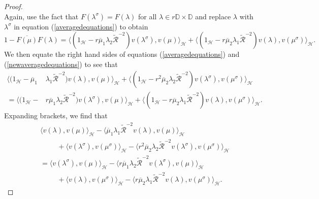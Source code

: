 \documentclass[10pt,a4paper]{amsart}
\begin{document}
\begin{proof}
\begin{equation}
\end{equation}
Again, use the fact that $F(\lambda^{\sigma})=F(\lambda)$ for all $\lambda\in r \mathbb{D}\times\mathbb{D}$ and replace $\lambda$ with $\lambda^{\sigma}$ in equation (\ref{averagedequations}) to obtain
\begin{equation}\label{newaveragedequations}
1-\overline{F(\mu)}F(\lambda) = \Big\langle(1_{\mathcal{H}}-r\overline{\mu}_{1}\lambda_{2}\widetilde{\mathcal{R}}^{-2})v(\lambda^{\sigma}),v(\mu)\Big\rangle_{\mathcal{H}}+\Big\langle(1_{\mathcal{H}}-r\overline{\mu}_{2}\lambda_{1}\widetilde{\mathcal{R}}^{-2})v({\lambda}),v({\mu}^{\sigma})\Big\rangle_{\mathcal{H}}.
\end{equation}
We then equate the right hand sides of equations (\ref{averagedequations}) and (\ref{newaveragedequations}) to see that
\begin{align*}
\Big\langle(1_{\mathcal{H}}-\overline{\mu}_{1}&\lambda_{1}\widetilde{\mathcal{R}}^{-2})v({\lambda}),v({\mu})\Big\rangle_{\mathcal{H}}+\Big\langle(1_{\mathcal{H}}-r^{2}\overline{\mu}_{2}\lambda_{2}\widetilde{\mathcal{R}}^{-2})v({\lambda}^{\sigma}),v({\mu}^{\sigma})\Big\rangle_{\mathcal{H}}\nonumber \\ 
= \Big\langle(1_{\mathcal{H}}-&r\overline{\mu}_{1}\lambda_{2}\widetilde{\mathcal{R}}^{-2})v(\lambda^{\sigma}),v(\mu)\Big\rangle_{\mathcal{H}}+\Big\langle(1_{\mathcal{H}}-r\overline{\mu}_{2}\lambda_{1}\widetilde{\mathcal{R}}^{-2})v({\lambda}),v({\mu}^{\sigma})\Big\rangle_{\mathcal{H}}. 
\end{align*}
Expanding brackets, we find that
\begin{align}
& \Big\langle v(\lambda), v(\mu) \Big\rangle_{\mathcal{H}} -  \Big\langle \overline{\mu}_{1}\lambda_{1} \widetilde{\mathcal{R}}^{-2} v(\lambda), v(\mu)\Big\rangle_{\mathcal{H}} \nonumber\\
& \hspace{1cm} + \Big\langle v(\lambda^{\sigma}), v(\mu^{\sigma})\Big\rangle_{\mathcal{H}} - \Big\langle r^{2}\overline{\mu}_{2}\lambda_{2}\widetilde{\mathcal{R}}^{-2}v(\lambda^{\sigma}), v(\mu^{\sigma}) \Big\rangle_{\mathcal{H}} \nonumber \\
& =\Big\langle v(\lambda^{\sigma}), v(\mu) \Big\rangle_{\mathcal{H}} - \Big\langle r\overline{\mu}_{1}\lambda_{2}\widetilde{\mathcal{R}}^{-2}v(\lambda^{\sigma}), v(\mu) \Big\rangle_{\mathcal{H}}
\nonumber\\
& \hspace{1cm} + \Big\langle v(\lambda), v(\mu^{\sigma})\Big\rangle_{\mathcal{H}}-\Big\langle r\overline{\mu}_{2}\lambda_{1}\widetilde{\mathcal{R}}^{-2}v(\lambda),v(\mu^{\sigma})\Big\rangle_{\mathcal{H}} \label{rearrangingthisequation}.

\end{align}
\end{proof}
\end{document}
